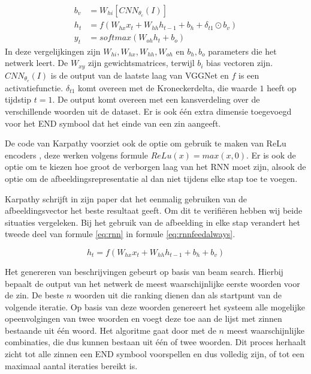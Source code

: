 \begin{equation}
\begin{aligned}
     b_v &= W_{hi} [CNN_{\theta_c}(I)] \\
     h_t &= f(W_{hx} x_{t} + W_{hh} h_{t-1} + b_h + \delta_{t1} \odot b_v) \\
     y_t &= softmax( W_{oh} h_t + b_o)
\end{aligned}
\label{eq:rnn}
\end{equation}
In deze vergelijkingen zijn $W_{hi}, W_{hx}, W_{hh}, W_{oh}$ en $b_h, b_o$ parameters die het netwerk leert. De $W_{xy}$ zijn gewichtsmatrices, terwijl $b_i$ bias vectoren zijn. $CNN_{\theta_c}(I)$ is de output van de laatste laag van VGGNet en $f$ is een activatiefunctie. $\delta_{t1}$ komt overeen met de Kroneckerdelta, die waarde $1$ heeft op tijdstip $t=1$. De output komt overeen met een kansverdeling over de verschillende woorden uit de dataset. Er is ook \'e\'en extra dimensie toegevoegd voor het END symbool dat het einde van een zin aangeeft. 

De code van Karpathy voorziet ook de optie om gebruik te maken van ReLu encoders , deze werken volgens formule $ReLu(x) = max(x,0)$. Er is ook de optie om te kiezen hoe groot de verborgen laag van het RNN moet zijn, alsook de optie om de afbeeldingsrepresentatie al dan niet tijdens elke stap toe te voegen.

Karpathy schrijft in zijn paper dat het eenmalig gebruiken van de afbeeldingsvector het beste resultaat geeft. Om dit te verifi\"eren hebben wij beide situaties vergeleken. Bij het gebruik van de afbeelding in elke stap verandert het tweede deel van formule \eqref{eq:rnn} in formule \eqref{eq:rnnfeedalways}.

\begin{equation}
     h_t = f(W_{hx} x_{t} + W_{hh} h_{t-1} + b_h + b_v)
\label{eq:rnnfeedalways}
\end{equation}

Het genereren van beschrijvingen gebeurt op basis van beam search. Hierbij bepaalt de output van het netwerk de meest waarschijnlijke eerste woorden voor de zin. De beste $n$ woorden uit die ranking dienen dan als startpunt van de volgende iteratie. Op basis van deze woorden genereert het systeem alle mogelijke opeenvolgingen van twee woorden en voegt deze toe aan de lijst met zinnen bestaande uit \'e\'en woord. Het algoritme gaat door met de $n$ meest waarschijnlijke combinaties, die dus kunnen bestaan uit \'e\'en of twee woorden. Dit proces herhaalt zicht tot alle zinnen een END symbool voorspellen en dus volledig zijn, of tot een maximaal aantal iteraties bereikt is. 
 

